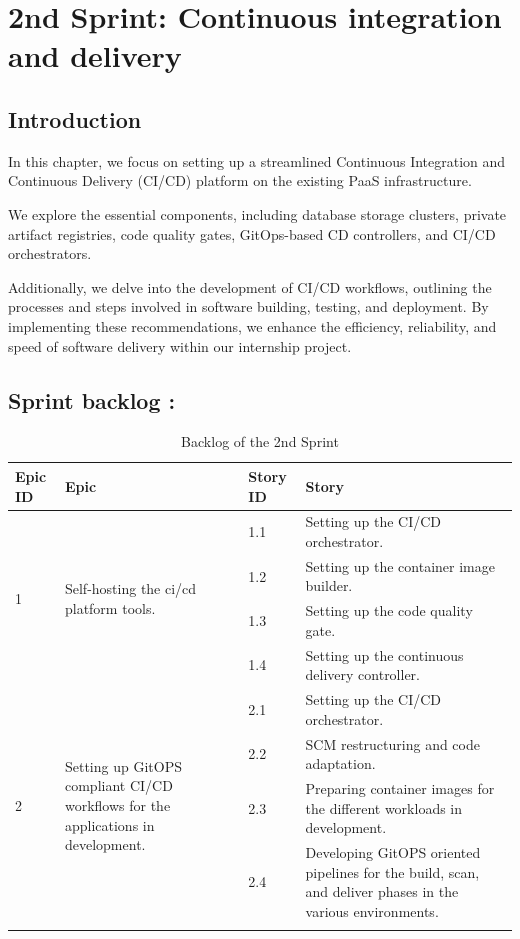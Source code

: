 \graphicspath{{./assets/}}
\setcounter{mtc}{3}
\chapter{2nd Sprint: Continuous integration and delivery }

\section*{Introduction}

\hspace{7mm}In this chapter, we focus on setting up a streamlined Continuous Integration and Continuous Delivery (CI/CD) platform on the existing PaaS infrastructure.

\hspace{7mm}We explore the essential components, including database storage clusters, private artifact registries, code quality gates, GitOps-based CD controllers, and CI/CD orchestrators.

\hspace{7mm}Additionally, we delve into the development of CI/CD workflows, outlining the processes and steps involved in software building, testing, and deployment. By implementing these recommendations, we enhance the efficiency, reliability, and speed of software delivery within our internship project.

\section{Sprint backlog :}

\begin{longtable}[H]{|m{1.5cm}|m{4cm}|m{1.5cm}|m{8cm}|}
\hline
{\textbf{Epic ID}} & {\textbf{Epic}} & {\textbf{Story ID}} & {\textbf{Story}}\\
\hline
\multirow{4}{1.5cm}{1} & \multirow{4}{4cm}{Self-hosting the ci/cd platform tools.}  &  1.1	 & Setting up the CI/CD orchestrator.\\
\cline{3-4}
& & 1.2 & Setting up the container image builder. \\
\cline{3-4}
& & 1.3	& Setting up the code quality gate. \\
\cline{3-4}
& & 1.4	& Setting up the continuous delivery controller. \\
\cline{3-4}
\hline
\multirow{4}{1.5cm}{2} & \multirow{4}{4cm}{Setting up GitOPS compliant CI/CD workflows for the applications in development.}  &  2.1	 & Setting up the CI/CD orchestrator.\\
\cline{3-4}
& & 2.2 & SCM restructuring and code adaptation. \\
\cline{3-4}
& & 2.3	& Preparing container images for the different workloads in development.  \\
\cline{3-4}
& & 2.4	& Developing GitOPS oriented pipelines for the build, scan, and deliver phases in the various environments.  \\
\cline{3-4}
\hline
\caption{Backlog of the 2nd Sprint}
\end{longtable}

